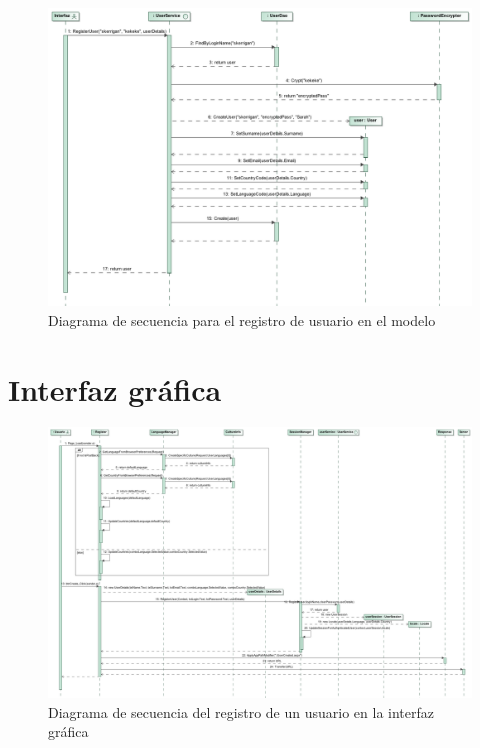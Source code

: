 \documentclass[a4paper,twoside]{article}
\begin{document}
\begin{figure}[htbp]
  \centering
  \caption{Diagrama de secuencia para el registro de usuario en el modelo}
  \includegraphics[width=\textheight,angle=90]{img/Secuencia_UserService.png}
\end{figure}





\newpage
\section{Interfaz gráfica}

\begin{figure}[H]
  \centering
  \caption{Diagrama de secuencia del registro de un usuario en la interfaz gráfica}
  \includegraphics[width=\textheight,angle=90]{img/Sequence_Register_Web.png}
\end{figure}
\end{document}
